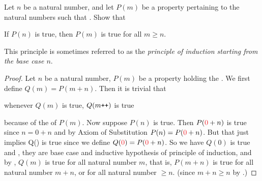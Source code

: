 \setcounter{exercise}{7}
\begin{exercise} \label{exercise 2.2.8}
Let \(n\) be a natural number, and let \(P(m)\) be a property pertaining to the natural numbers such that .  Show that
    \begin{center}
    If \(P(n)\) is true, then \(P(m)\) is true for all \(m \geq n\). 
    \end{center}
This principle is sometimes referred to as the \emph{principle of induction starting from the base case \(n\)}.
\end{exercise}
\begin{proof}
Let \(n\) be a natural number, \(P(m)\) be a property holding the . We first define \(Q(m) = P(m + n)\). Then it is trivial that     \begin{center}
    whenever \(Q(m)\) is true, \(Q(m\texttt{++})\) is true 
    \end{center}
because of the  of \(P(m)\). Now suppose \(P(n)\) is true. Then \(P(\RED{0} + n)\) is true since \(n = 0 + n\) and by Axiom of Substitution  \(P(n) = P(\RED{0} + n)\). But that just implies Q() is true since we define \(Q(\RED{0}) = P(\RED{0} + n)\). So we have \(Q(0)\) is true and , they are base case and inductive hypothesis of principle of induction, and by , \(Q(m)\) is true for all natural number \(m\), that is, \(P(m + n)\) is true for all natural number \(m + n\), or for all natural number \(\geq n\). (since \(m + n \geq n\) by .)
\end{proof}